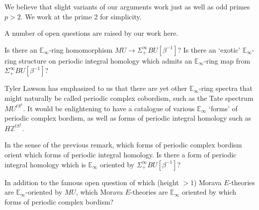 \begin{rmk} We believe that slight variants of our arguments work just as well as odd primes $p>2$.  We work at the prime $2$ for simplicity.
\end{rmk}

A number of open questions are raised by our work here.


\begin{qst} Is there an $\mathbb{E}_\infty$-ring homomorphism $MU \longrightarrow \Sigma^{\infty}_+ BU[\beta^{-1}]$?  Is there an `exotic' $\mathbb{E}_\infty$-ring structure on periodic integral homology which admits an $\mathbb{E}_\infty$-ring map from $\Sigma^{\infty}_+ BU[\beta^{-1}]$?
\end{qst}

\begin{rmk} Tyler Lawson has emphasized to us that there are yet other $\mathbb{E}_\infty$-ring spectra that might naturally be called periodic complex cobordism, such as the Tate spectrum $MU^{tS^1}$.  It would be enlightening to have a catalogue of various $\mathbb{E}_\infty$ `forms' of periodic complex bordism, as well as forms of periodic integral homology such as $H\mathbb{Z}^{tS^1}$.
\end{rmk}

\begin{qst}
In the sense of the previous remark, which forms of periodic complex bordism orient which forms of periodic integral homology.  Is there a form of periodic integral homology which is $\mathbb{E}_\infty$ oriented by $\Sigma^{\infty}_+ BU[\beta^{-1}]$?
\end{qst}

\begin{qst}
In addition to the famous open question of which (height $>1$) Morava $E$-theories are $\mathbb{E}_\infty$-oriented by $MU$, which Morava $E$-theories are $\mathbb{E}_\infty$ oriented by which forms of periodic complex bordism?
\end{qst}